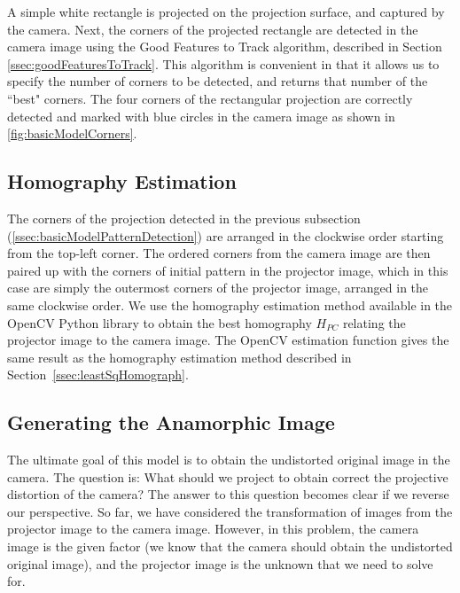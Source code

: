 \documentclass[11pt, oneside, reqno]{book}
\begin{document}
A simple white rectangle is projected on the projection surface, and captured by the camera. Next, the corners of the projected rectangle are detected in the camera image using the Good Features to Track algorithm, described in Section \ref{ssec:goodFeaturesToTrack}. This algorithm is convenient in that it allows us to specify the number of corners to be detected, and returns that number of the ``best" corners.
The four corners of the rectangular projection are correctly detected and marked with blue circles in the camera image as shown in \ref{fig:basicModelCorners}.

\subsection{Homography Estimation}
\label{ssec:basicModelFindhomography}

The corners of the projection detected in the previous subsection (\ref{ssec:basicModelPatternDetection}) are arranged in the clockwise order starting from the top-left corner. The ordered corners from the camera image are then paired up with the corners of initial pattern in the projector image, which in this case are simply the outermost corners of the projector image, arranged in the same clockwise order. We use the homography estimation method available in the OpenCV Python library to obtain the best homography $H_{PC}$ relating the projector image to the camera image. The OpenCV estimation function gives the same result as the homography estimation method described in Section~\ref{ssec:leastSqHomograph}.



\subsection{Generating the Anamorphic Image}
\label{ssec:basicModelGeneratingAnamorph}

The ultimate goal of this model is to obtain the undistorted original image in the camera. The question is: What should we project to obtain correct the projective distortion of the camera? The answer to this question becomes clear if we reverse our perspective. So far, we have considered the transformation of images from the projector image to the camera image. However, in this problem, the camera image is the given factor (we know that the camera should obtain the undistorted original image), and the projector image is the unknown that we need to solve for.
\end{document}
